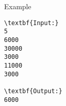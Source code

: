 Example
\begin{verbatim}
\textbf{Input:}
5
6000
30000
3000
11000
3000

\textbf{Output:}
6000\end{verbatim}